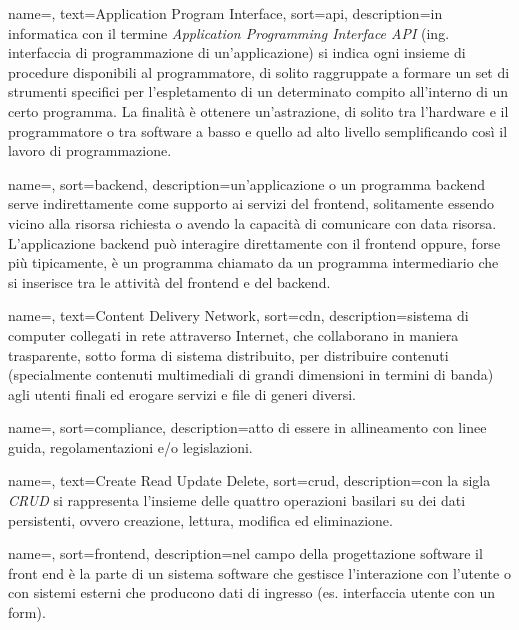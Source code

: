 {
    name=,
    text=Application Program Interface,
    sort=api,
    description={in informatica con il termine \emph{Application Programming Interface API} (ing. interfaccia di programmazione di un'applicazione) si indica ogni insieme di procedure disponibili al programmatore, di solito raggruppate a formare un set di strumenti specifici per l'espletamento di un determinato compito all'interno di un certo programma. La finalità è ottenere un'astrazione, di solito tra l'hardware e il programmatore o tra software a basso e quello ad alto livello semplificando così il lavoro di programmazione.}
}

{
	name=,
	sort=backend,
	description={un'applicazione o un programma backend serve indirettamente come supporto ai servizi del frontend, solitamente essendo vicino alla risorsa richiesta o avendo la capacità di comunicare con data risorsa. L'applicazione backend può interagire direttamente con il frontend oppure, forse più tipicamente, è un programma chiamato da un programma intermediario che si inserisce tra le attività del frontend e del backend.}
}

{
	name=,
	text=Content Delivery Network,
	sort=cdn,
	description={sistema di computer collegati in rete attraverso Internet, che collaborano in maniera trasparente, sotto forma di sistema distribuito, per distribuire contenuti (specialmente contenuti multimediali di grandi dimensioni in termini di banda) agli utenti finali ed erogare servizi e file di generi diversi.}
}

{
	name=,
	sort=compliance,
	description={atto di essere in allineamento con linee guida, regolamentazioni e/o legislazioni.}
}

{
	name=,
	text=Create Read Update Delete,
	sort=crud,
	description={con la sigla \emph{CRUD} si rappresenta l'insieme delle quattro operazioni basilari su dei dati persistenti, ovvero creazione, lettura, modifica ed eliminazione.}
}

{
	name=,
	sort=frontend,
	description={nel campo della progettazione software il front end è la parte di un sistema software che gestisce l'interazione con l'utente o con sistemi esterni che producono dati di ingresso (es. interfaccia utente con un form).}
}

